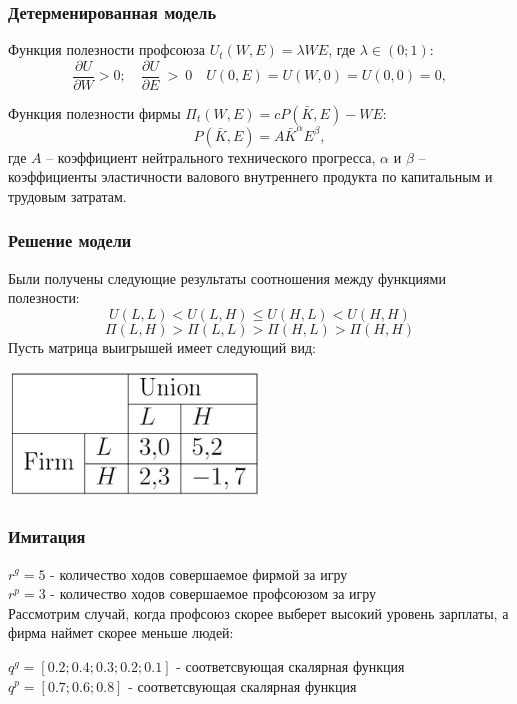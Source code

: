 \documentclass {beamer}
\begin{document}
\begin{frame}
	
	\frametitle{Детерменированная модель}
	Функция полезности профсоюза  $U_t(W,E)=\lambda WE$, где $\lambda \in(0;1)$:
	$$\frac{\partial U}{\partial W} > 0; \quad \frac{\partial U}{\partial E}~>~0 \quad U(0,E)=U(W,0)=U(0,0)=0,$$
	
	Функция полезности фирмы $\Pi_t(W,E)=cP(\bar{K},E)-WE$:
	$$P(\bar{K}, E)=A\bar{K}^\alpha E^\beta,$$ где $A$ – коэффициент нейтрального технического прогресса, $\alpha$ и $\beta$ – коэффициенты эластичности валового внутреннего продукта по капитальным и трудовым затратам.\\
\end{frame}

\begin{frame}
	\frametitle{Решение модели}
	Были получены следующие результаты соотношения между функциями полезности:
		$$U(L,L) < U(L,H) \le U(H, L) < U(H,H) $$
		$$\Pi(L,H) > \Pi(L,L) > \Pi(H, L) > \Pi(H,H) $$
	Пусть матрица выигрышей имеет следующий вид:
	
	\begin{center}
		\includegraphics[width=0.5\textwidth]{seventh}
	\end{center}
\end{frame}

\begin{frame}
	\frametitle{Имитация}
	$r^g= 5 $ - количество ходов совершаемое фирмой за игру\\
	$r^p= 3 $ - количество ходов совершаемое профсоюзом за игру\\
	Рассмотрим случай, когда профсоюз скорее выберет высокий уровень зарплаты, а фирма наймет скорее меньше людей:
	
	$q^g =[ 0.2; 0.4; 0.3; 0.2; 0.1]$ - соответсвующая скалярная функция \\
	$q^p=[0.7; 0.6; 0.8] $ - соответсвующая скалярная функция \\
	

\end{frame}
\end{document}
